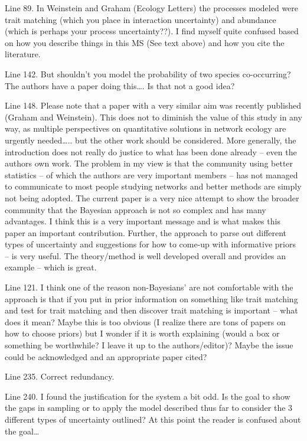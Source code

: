 \documentclass[12pt]{letter}
\begin{document}
Line 89.  In Weinstein and Graham (Ecology Letters) the processes modeled were trait matching (which you place in interaction uncertainty) and abundance (which is perhaps your process uncertainty??).  I find myself quite confused based on how you describe things in this MS (See text above) and how you cite the literature.

Line 142.  But shouldn’t you model the probability of two species co-occurring?  The authors have a paper doing this…. Is that not a good idea?

Line 148.  Please note that a paper with a very similar aim was recently published (Graham and Weinstein).  This does not to diminish the value of this study in any way, as multiple perspectives on quantitative solutions in network ecology are urgently needed….. but the other work should be considered. More generally, the introduction does not really do justice to what has been done already – even the authors own work.  The problem in my view is that the community using better statistics – of which the authors are very important members – has not managed to communicate to most people studying networks and better methods are simply not being adopted.  The current paper is a very nice attempt to show the broader community that the Bayesian approach is not so complex and has many advantages.  I think this is a very important message and is what makes this paper an important contribution.  Further, the approach to parse out different types of uncertainty and suggestions for how to come-up with informative priors – is very useful.  The theory/method is well developed overall and provides an example – which is great.

Line 121.  I think one of the reason non-Bayesians’ are not comfortable with the approach is that if you put in prior information on something like trait matching and test for trait matching and then discover trait matching is important – what does it mean?  Maybe this is too obvious (I realize there are tons of papers on how to choose priors) but I wonder if it is worth explaining (would a box or something be worthwhile?  I leave it up to the authors/editor)?  Maybe the issue could be acknowledged and an appropriate paper cited?

Line 235.  Correct redundancy.

Line 240.  I found the justification for the system a bit odd.  Is the goal to show the gaps in sampling or to apply the model described thus far to consider the 3 different types of uncertainty outlined?  At this point the reader is confused about the goal…
\end{document}
